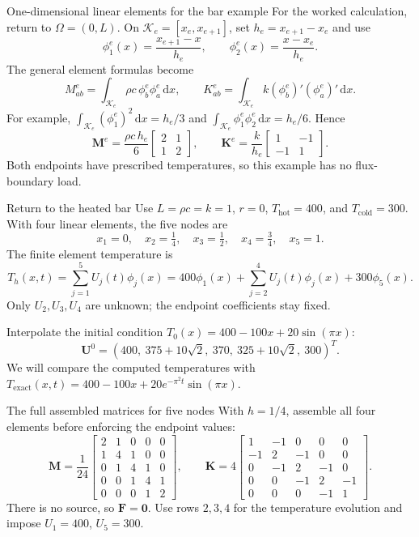 \documentclass[11pt,aspectratio=169]{beamer}
\newcommand{\dd}{\mathrm d}
\newcommand{\bU}{\bm U}
\newcommand{\bM}{\bm M}
\newcommand{\bK}{\bm K}
\newcommand{\bF}{\bm F}
\newcommand{\Thot}{T_{\mathrm{hot}}}
\newcommand{\Tcold}{T_{\mathrm{cold}}}
\begin{document}
\begin{frame}{One-dimensional linear elements for the bar example}
For the worked calculation, return to $\Omega=(0,L)$.
On $\mathcal K_e=[x_e,x_{e+1}]$, set $h_e=x_{e+1}-x_e$ and use
\[
\phi_1^e(x)=\frac{x_{e+1}-x}{h_e},
\qquad \phi_2^e(x)=\frac{x-x_e}{h_e}.
\]
The general element formulas become
\[
M^e_{ab}=\int_{\mathcal K_e}\rho c\,\phi_b^e\phi_a^e\,\dd x,
\qquad K^e_{ab}=\int_{\mathcal K_e}k(\phi_b^e)'(\phi_a^e)'\,\dd x.
\]
For example,
$\int_{\mathcal K_e}(\phi_1^e)^2\,\dd x=h_e/3$ and
$\int_{\mathcal K_e}\phi_1^e\phi_2^e\,\dd x=h_e/6$.
Hence
\[
\boxed{\bM^e=\frac{\rho c\,h_e}{6}\begin{bmatrix}2&1\\1&2\end{bmatrix},
\qquad
\bK^e=\frac{k}{h_e}\begin{bmatrix}1&-1\\-1&1\end{bmatrix}.}
\]
Both endpoints have prescribed temperatures, so this example has no flux-boundary load.
\end{frame}

\begin{frame}{Return to the heated bar}
Use $L=\rho c=k=1$, $r=0$, $\Thot=400$, and $\Tcold=300$.
With four linear elements, the five nodes are
\[
x_1=0,\quad x_2=\tfrac14,\quad x_3=\tfrac12,\quad
x_4=\tfrac34,\quad x_5=1.
\]
The finite element temperature is
\[
T_h(x,t)=\sum_{j=1}^{5}U_j(t)\phi_j(x)
=400\phi_1(x)+\sum_{j=2}^4U_j(t)\phi_j(x)+300\phi_5(x).
\]
Only $U_2,U_3,U_4$ are unknown; the endpoint coefficients stay fixed.
\medskip

Interpolate the initial condition $T_0(x)=400-100x+20\sin(\pi x)$:
\[
\bU^0=(400,\ 375+10\sqrt2,\ 370,\ 325+10\sqrt2,\ 300)^T.
\]
We will compare the computed temperatures with
$T_{\mathrm{exact}}(x,t)=400-100x+20e^{-\pi^2t}\sin(\pi x)$.
\end{frame}

\begin{frame}{The full assembled matrices for five nodes}
With $h=1/4$, assemble all four elements before enforcing the endpoint values:
\[
\bM=\frac1{24}
\begin{bmatrix}
2&1&0&0&0\\
1&4&1&0&0\\
0&1&4&1&0\\
0&0&1&4&1\\
0&0&0&1&2
\end{bmatrix},
\qquad
\bK=4
\begin{bmatrix}
1&-1&0&0&0\\
-1&2&-1&0&0\\
0&-1&2&-1&0\\
0&0&-1&2&-1\\
0&0&0&-1&1
\end{bmatrix}.
\]
There is no source, so $\bF=\bm0$.
Use rows $2,3,4$ for the temperature evolution and impose $U_1=400$, $U_5=300$.
\end{frame}
\end{document}
